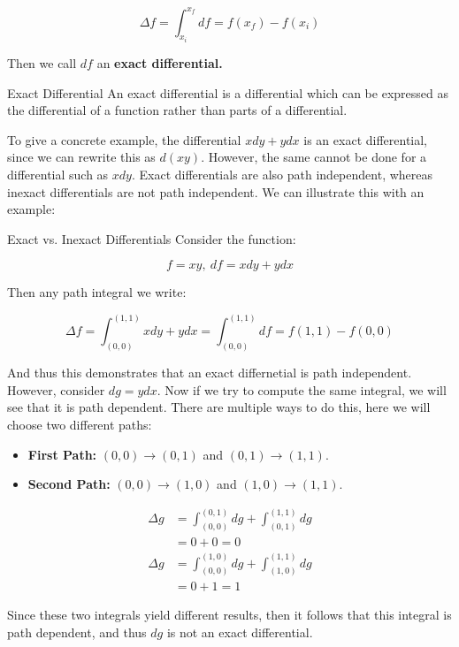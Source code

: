     \[ \Delta f = \int_{x_i}^{x_f} df = f(x_f) - f(x_i)\] 

    Then we call $df$ an \textbf{exact differential.}


    \begin{definition}{Exact Differential}{}
        An exact differential is a differential which can be expressed as the differential of a function rather than parts of a differential.
    \end{definition}
    To give a concrete example, the differential $x dy + ydx$ is an exact differential, since we can rewrite this as $d(xy)$. However, the same cannot be done for a differential such as $x dy$. Exact differentials are also path independent, whereas inexact differentials are not path independent. We can illustrate this with an example:

    \begin{example}{Exact vs. Inexact Differentials}{}
        Consider the function:

        \[ f = xy, \ df = xdy + ydx\]

        Then any path integral we write:

        \[ \Delta f = \int_{(0,0)}^{(1,1)} xdy + ydx = \int_{(0,0)}^{(1, 1)} df = f(1, 1) - f(0, 0)\] 

        And thus this demonstrates that an exact differnetial is path independent. However, consider $dg = ydx$. Now if we try to compute the same integral, we will see that it is path dependent. There are multiple ways to do this, here we will choose two different paths: 
        \begin{itemize}
            \item \textbf{First Path:} $(0,0) \to (0, 1)$ and $(0, 1) \to (1, 1)$. 
            \item \textbf{Second Path:} $(0, 0) \to (1, 0)$ and $(1, 0) \to (1, 1)$.
        \end{itemize}

        \begin{align*}
            \Delta g &= \int_{(0, 0)}^{(0, 1)} dg + \int_{(0, 1)}^{(1, 1)} dg\\
            &= 0 + 0 = 0\\
            \Delta g &= \int_{(0, 0)}^{(1, 0)} dg + \int_{(1, 0)}^{(1, 1)} dg\\
            &= 0 + 1 = 1
        \end{align*}

        Since these two integrals yield different results, then it follows that this integral is path dependent, and thus $dg$ is not an exact differential. 
    \end{example}


